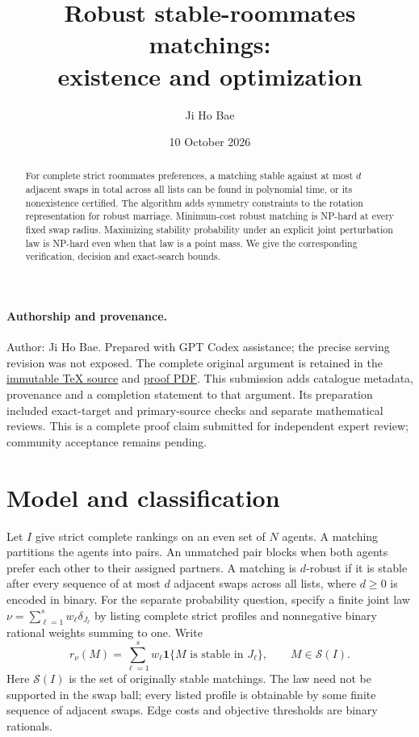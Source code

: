 \documentclass[11pt]{article}
\title{Robust stable-roommates matchings:\\existence and optimization}
\author{Ji Ho Bae}
\date{10 October 2026}
\begin{document}
\maketitle

\paragraph{Authorship and provenance.}
Author: Ji Ho Bae. Prepared with GPT Codex assistance; the precise serving
revision was not exposed. The complete original argument is retained in
the \href{https://github.com/jbaelaw/robust-roommates-proof/blob/07e1c1655e18eaee6bb20468771afe6beabd93e5/paper/Proof.tex}{immutable TeX source} and
\href{https://github.com/jbaelaw/robust-roommates-proof/blob/07e1c1655e18eaee6bb20468771afe6beabd93e5/paper/Proof.pdf}{proof PDF}. This submission adds catalogue metadata,
provenance and a completion statement to that argument. Its preparation
included exact-target and primary-source checks and separate mathematical
reviews. This is a complete proof claim submitted for independent expert
review; community acceptance remains pending.

\begin{abstract}
For complete strict roommates preferences, a matching stable against
at most $d$ adjacent swaps in total across all lists can be found in polynomial time,
or its nonexistence certified. The algorithm adds symmetry constraints
to the rotation representation for robust marriage. Minimum-cost robust
matching is NP-hard at every fixed swap radius. Maximizing stability
probability under an explicit joint perturbation law is NP-hard even
when that law is a point mass. We give the corresponding verification,
decision and exact-search bounds.
\end{abstract}

\section{Model and classification}
Let $I$ give strict complete rankings on an even set of $N$ agents.
A matching partitions the agents into pairs. An unmatched pair blocks
when both agents prefer each other to their assigned partners.
A matching is $d$-robust if it is stable after every sequence of at most
$d$ adjacent swaps across all lists, where $d\geq0$ is encoded in binary.
For the separate probability question, specify a finite joint law
$\nu=\sum_{\ell=1}^s w_\ell\delta_{J_\ell}$ by listing complete strict
profiles and nonnegative binary rational weights summing to one. Write
\[
 r_\nu(M)=\sum_{\ell=1}^s w_\ell
       \mathbf1\{M\text{ is stable in }J_\ell\},\qquad M\in\mathcal S(I).
\]
Here $\mathcal S(I)$ is the set of originally stable matchings. The law
need not be supported in the swap ball; every listed profile is obtainable
by some finite sequence of adjacent swaps. Edge costs and objective
thresholds are binary rationals.
\end{document}
